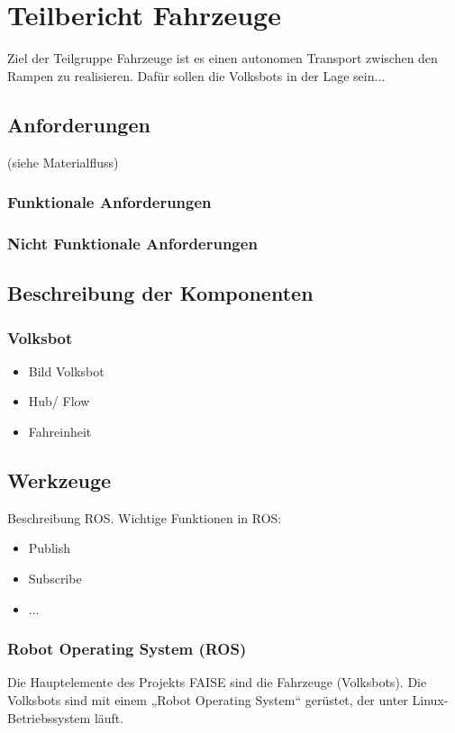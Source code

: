 \section{Teilbericht Fahrzeuge}
Ziel der Teilgruppe Fahrzeuge ist es einen autonomen Transport zwischen den Rampen zu realisieren. Dafür sollen die Volksbots in der Lage sein...
\subsection{Anforderungen}
(siehe Materialfluss)
\subsubsection{Funktionale Anforderungen}
\subsubsection{Nicht Funktionale Anforderungen}

\subsection{Beschreibung der Komponenten}
\subsubsection{Volksbot}
\begin{itemize}
\item Bild Volksbot
\item Hub/ Flow
\item Fahreinheit
\end{itemize}
\subsection{Werkzeuge}
Beschreibung ROS. 
Wichtige Funktionen in ROS:
\begin{itemize}
\item Publish
\item Subscribe
\item ...
\end{itemize}
\subsubsection{Robot Operating System (ROS)}
Die Hauptelemente des Projekts FAISE sind die Fahrzeuge (Volksbots). Die Volksbots sind
mit einem „Robot Operating System“ gerüstet, der unter Linux- Betriebssystem läuft.
